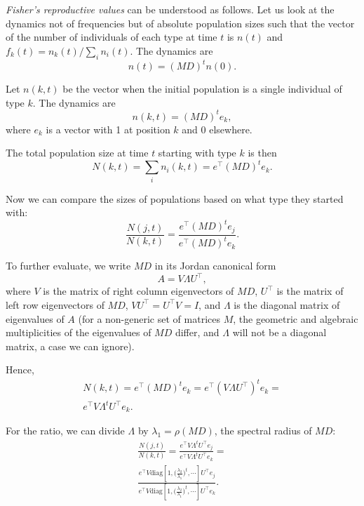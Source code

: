 \documentclass[9pt, a4paper, twocolumn]{extarticle}   	%
\newcommand*{\tr}{^\intercal}
\newcommand{\matrx}[1]{{\left[ \stackrel{}{#1}\right]}}
\newcommand{\diag}[1]{\mbox{diag}\matrx{#1}}
\begin{document}
\emph{Fisher's reproductive values} can be understood as follows.
Let us look at the dynamics not of frequencies but of absolute population sizes such that the vector of the number of individuals of each type at time $t$ is $n(t)$ and $f_k(t) = n_k(t) / \sum_i{n_i(t)}$.
The dynamics are
\begin{equation}
n(t) = (MD)^t n(0).
\end{equation}

Let $n(k, t)$ be the vector when the initial population is a single individual of type $k$.
The dynamics are
\begin{equation}
n(k,t) = (MD)^t e_k,
\end{equation}
where $e_k$ is a vector with 1 at position $k$ and 0 elsewhere.

The total population size at time $t$ starting with type $k$ is then
\begin{equation}
N(k,t) = \sum_i{n_i(k,t)} = e\tr (MD)^t e_k.
\end{equation}

Now we can compare the sizes of populations based on what type they started
with:
\begin{equation}
\frac{N(j,t)}{N(k,t)} = \frac{e\tr (MD)^t e_j}{e\tr (MD)^t e_k}.
\end{equation}

To further evaluate, we write $MD$ in its Jordan canonical form 
\begin{equation}
A = V \Lambda U\tr,
\end{equation}
where $V$ is the matrix of right column eigenvectors of $MD$,
$U\tr$ is the matrix of left row eigenvectors of $MD$,
$V U\tr = U\tr V = I$, 
and $\Lambda$ is the diagonal matrix of eigenvalues of $A$ 
(for a non-generic set of matrices $M$, the geometric and algebraic multiplicities of the eigenvalues of $MD$ differ, and $\Lambda$ will not be a diagonal matrix, a case we can ignore).

Hence,
\begin{multline}
N(k, t) = 
e\tr (MD)^t e_k =
e\tr  (V \Lambda U\tr)^t e_k = \\
e\tr V \Lambda^t U\tr e_k.
\end{multline}

For the ratio, we can divide $\Lambda$ by $\lambda_1 = \rho(MD)$,
the spectral radius of $MD$:
\begin{multline}
\frac{N(j,t)}{N(k,t)} =
\frac{ e\tr V \Lambda^t U\tr e_j}{ e\tr V \Lambda^t U\tr e_k} = \\
\frac{ e\tr V \diag{1, \Big(\frac{\lambda_2}{\lambda_1}\Big)^t, \cdots} U\tr e_j} { e\tr V \diag{1,\Big(\frac{\lambda_2}{\lambda_1}\Big)^t, \cdots} U\tr e_k}.
\end{multline}
\end{document}
